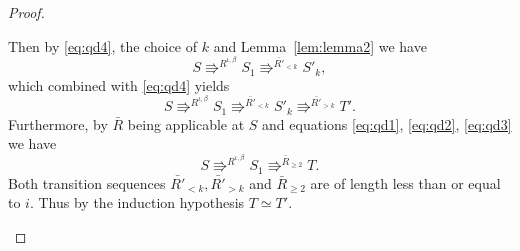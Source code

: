 \begin{proof}
\begin{description}
%

      Then by \eqref{eq:qd4}, the choice of $k$ and Lemma~\ref{lem:lemma2} we have
      \begin{equation*}
        S \Rrightarrow^{{R}^{\iota, \beta}} S_1 \Rrightarrow^{\bar{R'}_{<k}}
        S'_k,
      \end{equation*}
      which combined with \eqref{eq:qd4} yields
      \begin{equation*}
        S \Rrightarrow^{{R}^{\iota, \beta}} S_1 \Rrightarrow^{\bar{R'}_{<k}}
        S'_k \Rrightarrow^{\bar{R'}_{>k}} T'.
      \end{equation*}
      Furthermore, by $\bar{R}$ being applicable at $S$ and equations
      \eqref{eq:qd1}, \eqref{eq:qd2}, \eqref{eq:qd3} we have
      \begin{equation*}
        S \Rrightarrow^{R^{\iota, \beta}} S_1 \Rrightarrow^{\bar{R}_{\geq 2}}
        T.
      \end{equation*}
      Both transition sequences $\bar{R'}_{<k}, \bar{R'}_{>k}$ and
      $\bar{R}_{\geq 2}$ are of length less than or equal to $i$.  Thus by the
      induction hypothesis $T \simeq T'$.
  \end{description}
\end{proof}


